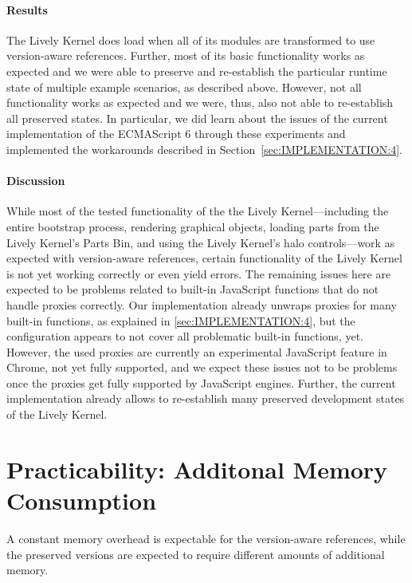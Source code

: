 \paragraph{Results}
The Lively Kernel does load when all of its modules are transformed to use version-aware references.
Further, most of its basic functionality works as expected and we were able to preserve and re-establish the particular runtime state of multiple example scenarios, as described above.
However, not all functionality works as expected and we were, thus, also not able to re-establish all preserved states. 
In particular, we did learn about the issues of the current implementation of the ECMAScript 6 through these experiments and implemented the workarounds described in Section~\ref{sec:IMPLEMENTATION:4}.

\paragraph{Discussion}
While most of the tested functionality of the the Lively Kernel---including the entire bootstrap process, rendering graphical objects, loading parts from the Lively Kernel's Parts Bin, and using the Lively Kernel's halo controls---work as expected with version-aware references, certain functionality of the Lively Kernel is not yet working correctly or even yield errors.
The remaining issues here are expected to be problems related to built-in JavaScript functions that do not handle proxies correctly.
Our implementation already unwraps proxies for many built-in functions, as explained in \ref{sec:IMPLEMENTATION:4}, but the configuration appears to not cover all problematic built-in functions, yet.
However, the used proxies are currently an experimental JavaScript feature in Chrome, not yet fully supported, and we expect these issues not to be problems once the proxies get fully supported by JavaScript engines.
Further, the current implementation already allows to re-establish many preserved development states of the Lively Kernel.




\section{Practicability: Additonal Memory Consumption} \label{sec:DISCUSSION:2}

A constant memory overhead is expectable for the version-aware references, while the preserved versions are expected to require different amounts of additional memory.

